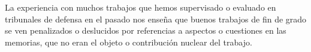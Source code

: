 La experiencia con muchos trabajos que hemos supervisado o evaluado en tribunales de defensa en el pasado nos enseña que buenos trabajos de fin de grado se ven penalizados o deslucidos por referencias a aspectos o cuestiones en las memorias, que no eran el objeto o contribución nuclear del trabajo.



